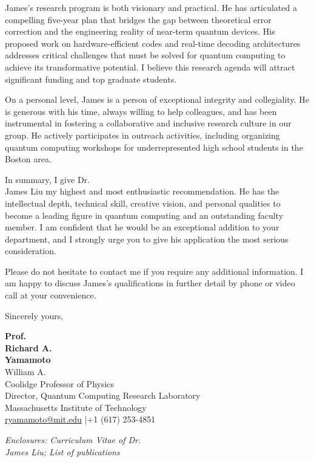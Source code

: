 \documentclass[12pt,a4paper]{article}
\begin{document}
James's research program is both visionary and practical. He has articulated a compelling five-year plan that bridges the gap between theoretical error correction and the engineering reality of near-term quantum devices. His proposed work on hardware-efficient codes and real-time decoding architectures addresses critical challenges that must be solved for quantum computing to achieve its transformative potential. I believe this research agenda will attract significant funding and top graduate students.

On a personal level, James is a person of exceptional integrity and collegiality. He is generous with his time, always willing to help colleagues, and has been instrumental in fostering a collaborative and inclusive research culture in our group. He actively participates in outreach activities, including organizing quantum computing workshops for underrepresented high school students in the Boston area.

In summary, I give Dr.\\ James Liu my highest and most enthusiastic recommendation. He has the intellectual depth, technical skill, creative vision, and personal qualities to become a leading figure in quantum computing and an outstanding faculty member. I am confident that he would be an exceptional addition to your department, and I strongly urge you to give his application the most serious consideration.

Please do not hesitate to contact me if you require any additional information. I am happy to discuss James's qualifications in further detail by phone or video call at your convenience.

\vspace{0.8cm}

Sincerely yours,

\vspace{1.2cm}

\textbf{Prof.\\ Richard A.\\ Yamamoto}\\
William A.\\ Coolidge Professor of Physics\\
Director, Quantum Computing Research Laboratory\\
Massachusetts Institute of Technology\\
\href{mailto:ryamamoto@mit.edu}{ryamamoto@mit.edu} \quad|\quad +1 (617) 253-4851

\vspace{1cm}

{\small\color{rulecolor}\textit{Enclosures: Curriculum Vitae of Dr.\\ James Liu; List of publications}}
\end{document}

